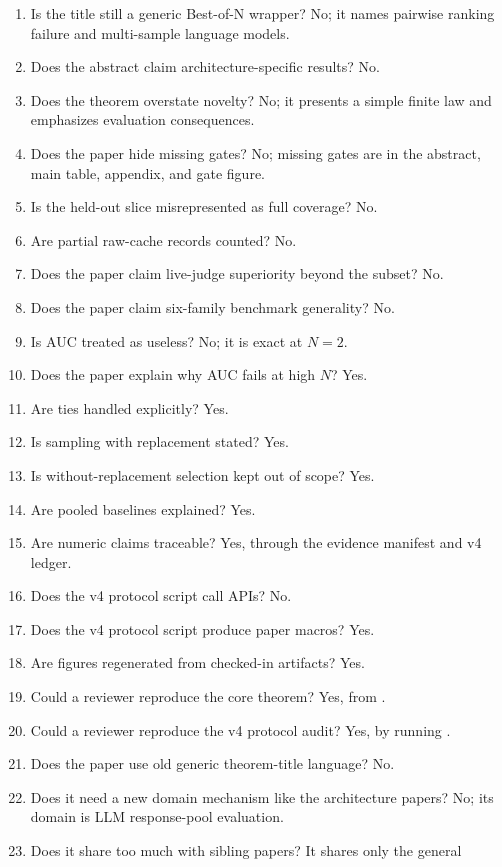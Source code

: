 \begin{enumerate}[leftmargin=*]
\item Is the title still a generic Best-of-N wrapper? No; it names pairwise
ranking failure and multi-sample language models.
\item Does the abstract claim architecture-specific results? No.
\item Does the theorem overstate novelty? No; it presents a simple finite law
and emphasizes evaluation consequences.
\item Does the paper hide missing gates? No; missing gates are in the abstract,
main table, appendix, and gate figure.
\item Is the held-out slice misrepresented as full coverage? No.
\item Are partial raw-cache records counted? No.
\item Does the paper claim live-judge superiority beyond the subset? No.
\item Does the paper claim six-family benchmark generality? No.
\item Is AUC treated as useless? No; it is exact at $N=2$.
\item Does the paper explain why AUC fails at high $N$? Yes.
\item Are ties handled explicitly? Yes.
\item Is sampling with replacement stated? Yes.
\item Is without-replacement selection kept out of scope? Yes.
\item Are pooled baselines explained? Yes.
\item Are numeric claims traceable? Yes, through the evidence manifest and v4
ledger.
\item Does the v4 protocol script call APIs? No.
\item Does the v4 protocol script produce paper macros? Yes.
\item Are figures regenerated from checked-in artifacts? Yes.
\item Could a reviewer reproduce the core theorem? Yes, from
.
\item Could a reviewer reproduce the v4 protocol audit? Yes, by running
.
\item Does the paper use old generic theorem-title language? No.
\item Does it need a new domain mechanism like the architecture papers? No; its
domain is LLM response-pool evaluation.
\item Does it share too much with sibling papers? It shares only the general

\end{enumerate}

